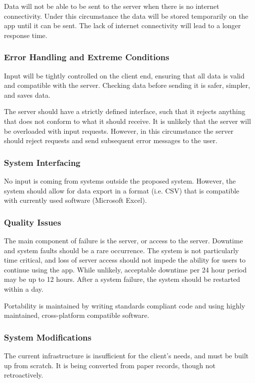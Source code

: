 \documentclass[a4paper, 11pt, titlepage]{article}
\begin{document}
Data will not be able to be sent to the server when there is no internet connectivity. Under this circumstance the data will be stored temporarily on the app until it can be sent. The lack of internet connectivity will lead to a longer response time.


\subsubsection{Error Handling and Extreme Conditions}
Input will be tightly controlled on the client end, ensuring that all data is valid and compatible with the server. Checking data before sending it is safer, simpler, and saves data.

The server should have a strictly defined interface, such that it rejects anything that does not conform to what it should receive. It is unlikely that the server will be overloaded with input requests. However, in this circumstance the server should reject requests and send subsequent error messages to the user.

\subsubsection{System Interfacing}
No input is coming from systems outside the proposed system. However, the system should allow for data export in a format (i.e. CSV) that is compatible with currently used software (Microsoft Excel).

\subsubsection{Quality Issues}
The main component of failure is the server, or access to the server. Downtime and system faults should be a rare occurrence. The system is not particularly time critical, and loss of server access should not impede the ability for users to continue using the app. While unlikely, acceptable downtime per 24 hour period may be up to 12 hours. After a system failure, the system should be restarted within a day.

Portability is maintained by writing standards compliant code and using highly maintained, cross-platform compatible software. 

\subsubsection{System Modifications}
The current infrastructure is insufficient for the client’s needs, and must be built up from scratch. It is being converted from paper records, though not retroactively.
\end{document}
